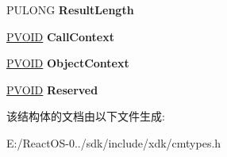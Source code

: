 \begin{DoxyCompactItemize}
\mbox{\label{struct___r_e_g___e_n_u_m_e_r_a_t_e___k_e_y___i_n_f_o_r_m_a_t_i_o_n_ac1644cb8e404ddd5587564933f80f9f1}} 
P\+U\+L\+O\+NG {\bfseries Result\+Length}
\item 
\mbox{\label{struct___r_e_g___e_n_u_m_e_r_a_t_e___k_e_y___i_n_f_o_r_m_a_t_i_o_n_ab31a1bfdc652669ccf31f0557853ed63}} 
\hyperlink{interfacevoid}{P\+V\+O\+ID} {\bfseries Call\+Context}
\item 
\mbox{\label{struct___r_e_g___e_n_u_m_e_r_a_t_e___k_e_y___i_n_f_o_r_m_a_t_i_o_n_acb01ec338e829d17bedbaf346fcea92b}} 
\hyperlink{interfacevoid}{P\+V\+O\+ID} {\bfseries Object\+Context}
\item 
\mbox{\label{struct___r_e_g___e_n_u_m_e_r_a_t_e___k_e_y___i_n_f_o_r_m_a_t_i_o_n_a49d48f3ff295f8a50c95f8ad21a50691}} 
\hyperlink{interfacevoid}{P\+V\+O\+ID} {\bfseries Reserved}
\end{DoxyCompactItemize}


该结构体的文档由以下文件生成\+:\begin{DoxyCompactItemize}
\item 
E\+:/\+React\+O\+S-\/0../sdk/include/xdk/cmtypes.\+h\end{DoxyCompactItemize}
